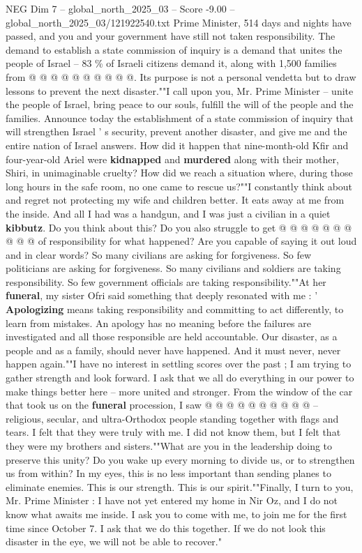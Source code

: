 \begin{textsample}{NEG Dim 7 – global\_north\_2025\_03 – Score -9.00 – global\_north\_2025\_03/121922540.txt}
Prime Minister, 514 days and nights have passed, and you and your government have still not taken responsibility.
The demand to establish a state commission of inquiry is a demand that unites the people of Israel -- 83 \% of Israeli citizens demand it, along with 1,500 families from @ @ @ @ @ @ @ @ @ @.
Its purpose is not a personal vendetta but to draw lessons to prevent the next disaster.""I call upon you, Mr.
Prime Minister -- unite the people of Israel, bring peace to our souls, fulfill the will of the people and the families.
Announce today the establishment of a state commission of inquiry that will strengthen Israel ' s security, prevent another disaster, and give me and the entire nation of Israel answers.
How did it happen that nine-month-old Kfir and four-year-old Ariel were \textbf{kidnapped} and \textbf{murdered} along with their mother, Shiri, in unimaginable cruelty?
How did we reach a situation where, during those long hours in the safe room, no one came to rescue us?""I constantly think about and regret not protecting my wife and children better.
It eats away at me from the inside.
And all I had was a handgun, and I was just a civilian in a quiet \textbf{kibbutz}.
Do you think about this?
Do you also struggle to get @ @ @ @ @ @ @ @ @ @ of responsibility for what happened?
Are you capable of saying it out loud and in clear words?
So many civilians are asking for forgiveness.
So few politicians are asking for forgiveness.
So many civilians and soldiers are taking responsibility.
So few government officials are taking responsibility.""At her \textbf{funeral}, my sister Ofri said something that deeply resonated with me : ' \textbf{Apologizing} means taking responsibility and committing to act differently, to learn from mistakes.
An apology has no meaning before the failures are investigated and all those responsible are held accountable.
Our disaster, as a people and as a family, should never have happened.
And it must never, never happen again.""I have no interest in settling scores over the past ; I am trying to gather strength and look forward.
I ask that we all do everything in our power to make things better here -- more united and stronger.
From the window of the car that took us on the \textbf{funeral} procession, I saw @ @ @ @ @ @ @ @ @ @ -- religious, secular, and ultra-Orthodox people standing together with flags and tears.
I felt that they were truly with me.
I did not know them, but I felt that they were my brothers and sisters.""What are you in the leadership doing to preserve this unity?
Do you wake up every morning to divide us, or to strengthen us from within?
In my eyes, this is no less important than sending planes to eliminate enemies.
This is our strength.
This is our spirit.""Finally, I turn to you, Mr.
Prime Minister : I have not yet entered my home in Nir Oz, and I do not know what awaits me inside.
I ask you to come with me, to join me for the first time since October 7.
I ask that we do this together.
If we do not look this disaster in the eye, we will not be able to recover."

\end{textsample}
